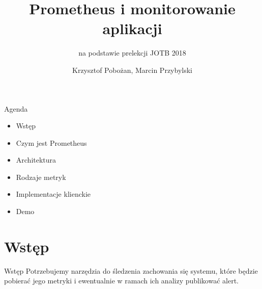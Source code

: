 \documentclass[epic,eepic,aspectratio=169,12pt]{beamer}
\begin{document}
	\title{Prometheus i monitorowanie aplikacji}
	\subtitle{na podstawie prelekcji JOTB 2018}
	\author{Krzysztof Pobożan, Marcin Przybylski}
\begin{frame}
	\maketitle
\end{frame}
\begin{frame}{Agenda}
	\begin{itemize}
		\item Wstęp
		\item Czym jest Prometheus
		\item Architektura
		\item Rodzaje metryk
		\item Implementacje klienckie
		\item Demo

	\end{itemize}
\end{frame}
\section{Wstęp}
\begin{frame}{Wstęp}
	Potrzebujemy narzędzia do śledzenia zachowania się systemu, które  będzie pobierać jego metryki i ewentualnie w ramach ich analizy publikować alert.
\end{frame}
\end{document}

